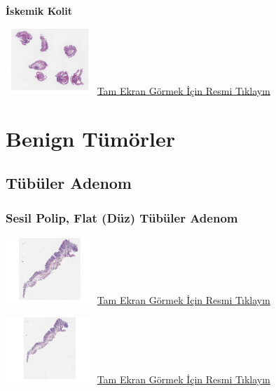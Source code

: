 \documentclass[
  letterpaper,
  DIV=11,
  numbers=noendperiod]{scrreprt}
\begin{document}
\textbf{İskemik Kolit}

\href{https://images.patolojiatlasi.com/ischemic-colitis/HE.html}{\includegraphics[width=0.25\textwidth,height=\textheight]{./screenshots/ischemic-colitis_screenshot.png}}
\href{https://images.patolojiatlasi.com/ischemic-colitis/HE.html}{Tam
Ekran Görmek İçin Resmi Tıklayın}

\hypertarget{sec-kolon-benign-tumorler}{%
\section{Benign Tümörler}\label{sec-kolon-benign-tumorler}}

\hypertarget{sec-kolon-tubuler-adenom}{%
\subsection{Tübüler Adenom}\label{sec-kolon-tubuler-adenom}}

\hypertarget{sec-kolon-sesil-polip}{%
\subsubsection{Sesil Polip, Flat (Düz) Tübüler
Adenom}\label{sec-kolon-sesil-polip}}

\href{https://images.patolojiatlasi.com/tubularadenoma-flat/HE.html}{\includegraphics[width=0.25\textwidth,height=\textheight]{./screenshots/tubularadenoma-flat1_screenshot.png}}
\href{https://images.patolojiatlasi.com/tubularadenoma-flat/HE.html}{Tam
Ekran Görmek İçin Resmi Tıklayın}

\href{https://images.patolojiatlasi.com/tubularadenoma-flat/HE2.html}{\includegraphics[width=0.25\textwidth,height=\textheight]{./screenshots/tubularadenoma-flat2_screenshot.png}}
\href{https://images.patolojiatlasi.com/tubularadenoma-flat/HE2.html}{Tam
Ekran Görmek İçin Resmi Tıklayın}
\end{document}
